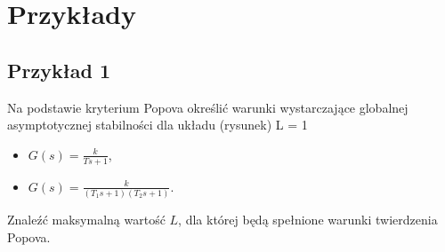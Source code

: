 \documentclass{article}
\begin{document}



\section{Przykłady}
    \subsection{Przykład 1}
    Na podstawie kryterium Popova określić warunki wystarczające globalnej asymptotycznej stabilności dla układu (rysunek) L = 1

    \begin{itemize}[(a)]
        \item $G(s) = \frac{k}{Ts + 1}$,
        \item $G(s) = \frac{k}{(T_{1}s + 1)(T_{2}s + 1)}$.
    \end{itemize}
    Znaleźć maksymalną wartość $L$, dla której będą spełnione warunki twierdzenia Popova.
\end{document}
